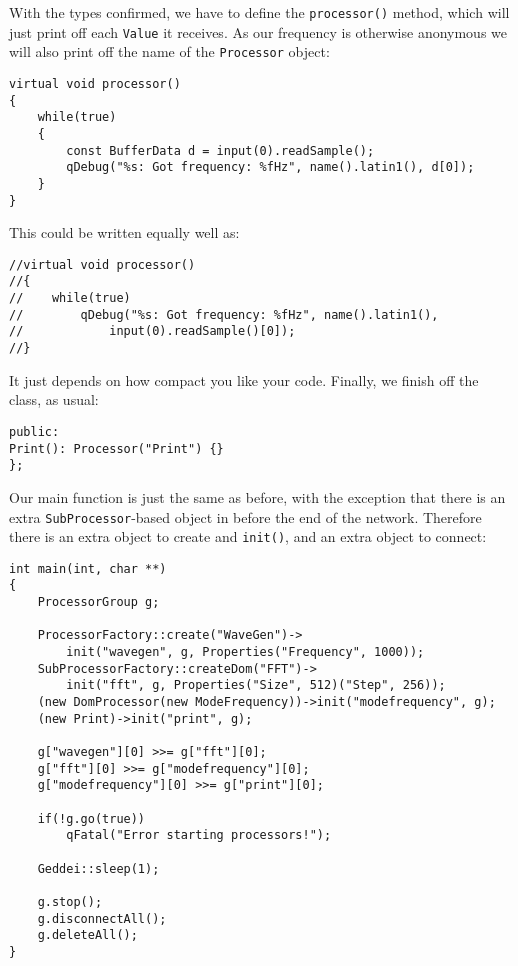 With the types confirmed, we have to define the \texttt{processor()} method, which will just print off each \texttt{Value} it receives. As our frequency is otherwise anonymous we will also print off the name of the \texttt{Processor} object:

\begin{verbatim}
virtual void processor()
{
    while(true)
    {
        const BufferData d = input(0).readSample();
        qDebug("%s: Got frequency: %fHz", name().latin1(), d[0]);
    }
}
\end{verbatim}

This could be written equally well as:

\begin{verbatim}
//virtual void processor()
//{
//    while(true)
//        qDebug("%s: Got frequency: %fHz", name().latin1(),
//            input(0).readSample()[0]);
//}
\end{verbatim}

It just depends on how compact you like your code. Finally, we finish off the class, as usual:

\begin{verbatim}
public:
Print(): Processor("Print") {}
};
\end{verbatim}

Our main function is just the same as before, with the exception that there is an extra \texttt{SubProcessor}-based object in before the end of the network. Therefore there is an extra object to create and \texttt{init()}, and an extra object to connect:

\begin{verbatim}
int main(int, char **)
{
    ProcessorGroup g;

    ProcessorFactory::create("WaveGen")->
        init("wavegen", g, Properties("Frequency", 1000));
    SubProcessorFactory::createDom("FFT")->
        init("fft", g, Properties("Size", 512)("Step", 256));
    (new DomProcessor(new ModeFrequency))->init("modefrequency", g);
    (new Print)->init("print", g);

    g["wavegen"][0] >>= g["fft"][0];
    g["fft"][0] >>= g["modefrequency"][0];
    g["modefrequency"][0] >>= g["print"][0];

    if(!g.go(true))
        qFatal("Error starting processors!");

    Geddei::sleep(1);

    g.stop();
    g.disconnectAll();
    g.deleteAll();
}
\end{verbatim}

